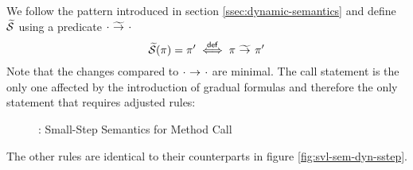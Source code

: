We follow the pattern introduced in section \ref{ssec:dynamic-semantics} and define $\widetilde{\mathcal{S}}$ using a predicate ${\cdot} \,\,{\widetilde{\rightarrow}^{}}\,\, {\cdot}$
\begin{displaymath}
\widetilde{\mathcal{S}}(\pi) = \pi' \overset{\textup{\textsf{def}}}{\iff} {\pi} \,\,{\widetilde{\rightarrow}^{}}\,\, {\pi'}
\end{displaymath}
Note that the changes compared to ${\cdot} \,\,{\rightarrow^{}}\,\, {\cdot}$ are minimal.
The call statement is the only one affected by the introduction of gradual formulas and therefore the only statement that requires adjusted rules:
\begin{figure}
    \boxed{\gsstep{\pi}{\pi}}
    
    \caption{\gvlidf: Small-Step Semantics for Method Call}
    \label{fig:gvl-sem-dyn-sstep}
\end{figure}

The other rules are identical to their counterparts in figure \ref{fig:svl-sem-dyn-sstep}.
